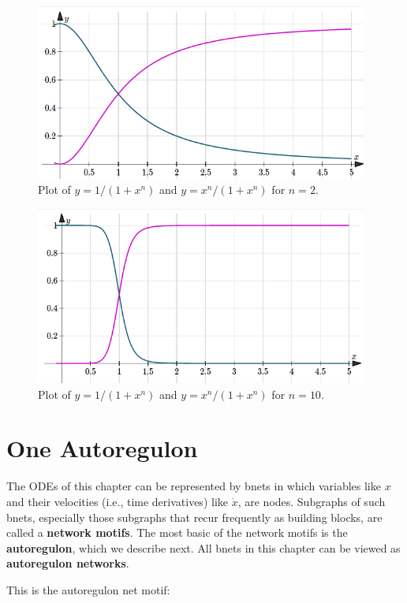 \begin{figure}[h!]
\centering
\includegraphics[width=4.3in]
{autoregulons/hill-2.png}
\caption{Plot of $y= 1/(1+x^n)$
and $y=x^n/(1+x^n)$ for $n=2$.}
\label{fig-hill-n-2}
\end{figure}

\begin{figure}[h!]
\centering
\includegraphics[width=4.3in]
{autoregulons/hill-10.png}
\caption{Plot of $y= 1/(1+x^n)$
and $y=x^n/(1+x^n)$ for $n=10$.}
\label{fig-hill-n-10}
\end{figure}

\section{One Autoregulon}

The ODEs of this chapter can be represented by bnets
in which variables like $x$ and 
their velocities (i.e., time derivatives)
like $\dot{x}$,
are nodes.
Subgraphs of such bnets, especially those
subgraphs that recur frequently as building blocks, are called
a {\bf network motifs}.  The most basic
of the network motifs is the {\bf autoregulon},
which we describe next.  All bnets
in this chapter can be viewed as {\bf autoregulon
networks}.


This is the autoregulon net motif: 

